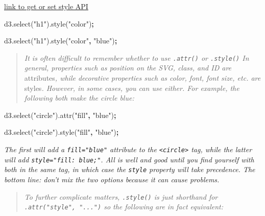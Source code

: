 \documentclass[openany]{book}
\newenvironment{Shaded}{\begin{snugshade}}{\end{snugshade}}
\newcommand{\AttributeTok}[1]{\textcolor[rgb]{0.77,0.63,0.00}{#1}}
\newcommand{\NormalTok}[1]{#1}
\newcommand{\OperatorTok}[1]{\textcolor[rgb]{0.81,0.36,0.00}{\textbf{#1}}}
\newcommand{\StringTok}[1]{\textcolor[rgb]{0.31,0.60,0.02}{#1}}
\newcommand{\VariableTok}[1]{\textcolor[rgb]{0.00,0.00,0.00}{#1}}
\begin{document}
\href{https://github.com/d3/d3-selection/blob/v1.4.0/README.md\#selection_style}{link to get or set style API}

\begin{Shaded}
\begin{Highlighting}[]
\VariableTok{d3}\NormalTok{.}\AttributeTok{select}\NormalTok{(}\StringTok{"h1"}\NormalTok{).}\AttributeTok{style}\NormalTok{(}\StringTok{"color"}\NormalTok{)}\OperatorTok{;}

\VariableTok{d3}\NormalTok{.}\AttributeTok{select}\NormalTok{(}\StringTok{"h1"}\NormalTok{).}\AttributeTok{style}\NormalTok{(}\StringTok{"color"}\OperatorTok{,} \StringTok{"blue"}\NormalTok{)}\OperatorTok{;}
\end{Highlighting}
\end{Shaded}

\begin{quote}
 \emph{It is often difficult to remember whether to use \texttt{.attr()} or \texttt{.style()} In general, properties such as position on the SVG, class, and ID are }attributes\emph{, while decorative properties such as color, font, font size, etc. are }styles\emph{. However, in some cases, you can use either. For example, the following both make the circle blue:}
\end{quote}

\begin{Shaded}
\begin{Highlighting}[]
\VariableTok{d3}\NormalTok{.}\AttributeTok{select}\NormalTok{(}\StringTok{"circle"}\NormalTok{).}\AttributeTok{attr}\NormalTok{(}\StringTok{"fill"}\OperatorTok{,} \StringTok{"blue"}\NormalTok{)}\OperatorTok{;}

\VariableTok{d3}\NormalTok{.}\AttributeTok{select}\NormalTok{(}\StringTok{"circle"}\NormalTok{).}\AttributeTok{style}\NormalTok{(}\StringTok{"fill"}\OperatorTok{,} \StringTok{"blue"}\NormalTok{)}\OperatorTok{;}
\end{Highlighting}
\end{Shaded}

\emph{The first will add a \texttt{fill="blue"} attribute to the \texttt{\textless{}circle\textgreater{}} tag, while the latter will add \texttt{style="fill:\ blue;"}. All is well and good until you find yourself with both in the same tag, in which case the \texttt{style} property will take precedence. The bottom line: don't mix the two options because it can cause problems.}

\begin{quote}
 \emph{To further complicate matters, \texttt{.style()} is just shorthand for \texttt{.attr("style",\ "...")} so the following are in fact equivalent:}
\end{quote}
\end{document}
